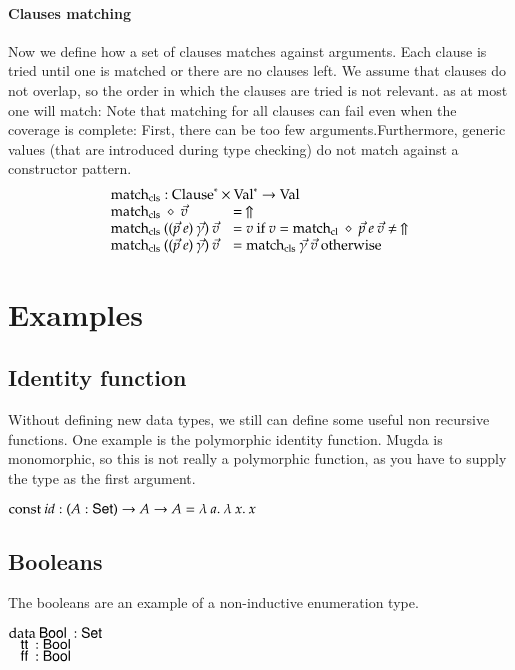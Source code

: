 \paragraph*{Clauses matching} 
Now we define how a set of clauses matches against arguments. 
Each clause is tried until one is matched or there are no clauses left. We assume that clauses do not overlap, so the order in which the clauses are tried is not relevant. as at most one will match:
Note that matching for all clauses can fail even when the coverage is complete: First, there can be too few arguments.Furthermore, generic values (that are introduced during type checking) do not match against a constructor pattern. 
\[
\begin{array}{ll}
\multicolumn{2}{l}{\matchcls : \ves{\Clause} \times \ves{\Val} \ra \Val}\\
\matchcls \: \diamond \: \vec{v} & = \stuck \\
\matchcls \:  ((\vec{p} \: e)\:\vec{\gamma}) \: \vec{v} & = v \mbox{ if } v = \matchcl \: \diamond \: \vec{p} \: e \:  \vec{v} \neq \stuck \\
\matchcls \: ((\vec{p} \: e)\:\vec{\gamma}) \: \vec{v} & = \matchcls \: \vec{\gamma} \: \vec{v} \mbox{ otherwise}  
\end{array}
\]


\section{Examples}
\subsection{Identity function}
Without defining new data types, we still can define some useful non recursive functions.
One example is the polymorphic identity function. 
Mugda is monomorphic, so this is not really a polymorphic function, as you have to supply the
type as the first argument.
\begin{bsp}
$\mathrm{const}\: id : ( A : \mathsf{Set} ) \rightarrow{A \rightarrow A} = \lambda\: a .\:\lambda\: x .\:x$   
\end{bsp}

\subsection{Booleans}
The booleans are an example of a non-inductive enumeration type.
\begin{bsp}
$\mathrm{data}\: \mathsf{Bool}\: : \mathsf{Set}$  \\
$\hspace*{3mm} \mathsf{tt}\: : \mathsf{Bool}\: $\\
$\hspace*{3mm} \mathsf{ff}\: : \mathsf{Bool}\: $
\end{bsp}

